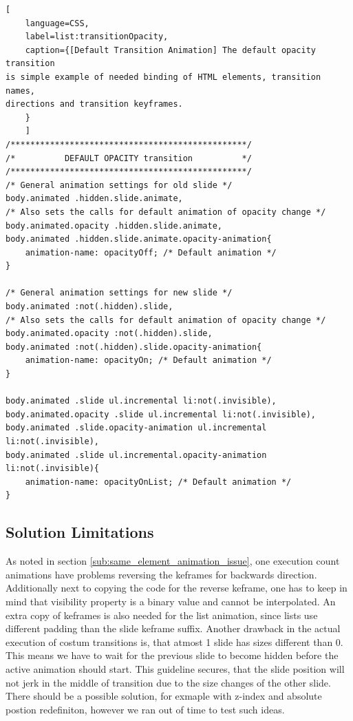 \begin{minipage}{\linewidth}
	\begin{lstlisting}[
	language=CSS,
	label=list:transitionOpacity,
	caption={[Default Transition Animation] The default opacity transition 
is simple example of needed binding of HTML elements, transition names, 
directions and transition keyframes.
	}
	]
/************************************************/
/*			DEFAULT OPACITY transition			*/
/************************************************/
/* General animation settings for old slide */
body.animated .hidden.slide.animate,
/* Also sets the calls for default animation of opacity change */
body.animated.opacity .hidden.slide.animate,
body.animated .hidden.slide.animate.opacity-animation{
	animation-name: opacityOff; /* Default animation */
}

/* General animation settings for new slide */
body.animated :not(.hidden).slide,
/* Also sets the calls for default animation of opacity change */
body.animated.opacity :not(.hidden).slide,
body.animated :not(.hidden).slide.opacity-animation{
	animation-name: opacityOn; /* Default animation */
}

body.animated .slide ul.incremental li:not(.invisible),
body.animated.opacity .slide ul.incremental li:not(.invisible),
body.animated .slide.opacity-animation ul.incremental li:not(.invisible),
body.animated .slide ul.incremental.opacity-animation li:not(.invisible){
	animation-name: opacityOnList; /* Default animation */	
}
	\end{lstlisting}
\end{minipage}


\subsection{Solution Limitations} %
\label{sub:solution_limitations}

As noted in section \ref{sub:same_element_animation_issue}, one execution count 
animations have problems reversing the keframes for backwards direction. 
Additionally next to copying the code for the reverse keframe, one has to keep 
in mind that visibility property is a binary value and cannot be interpolated. 
An extra copy of keframes is also needed for the list animation, since lists 
use different padding than the slide keframe suffix. Another drawback in the 
actual execution of costum transitions is, that atmost 1 slide has sizes 
different than 0. This means we have to wait for the previous slide to become 
hidden before the active animation should start. This guideline secures, that 
the slide position will not jerk in the middle of transition due to the size 
changes of the other slide. There should be a possible solution, for exmaple 
with z-index and absolute postion redefiniton, however we ran out of time to 
test such ideas.

